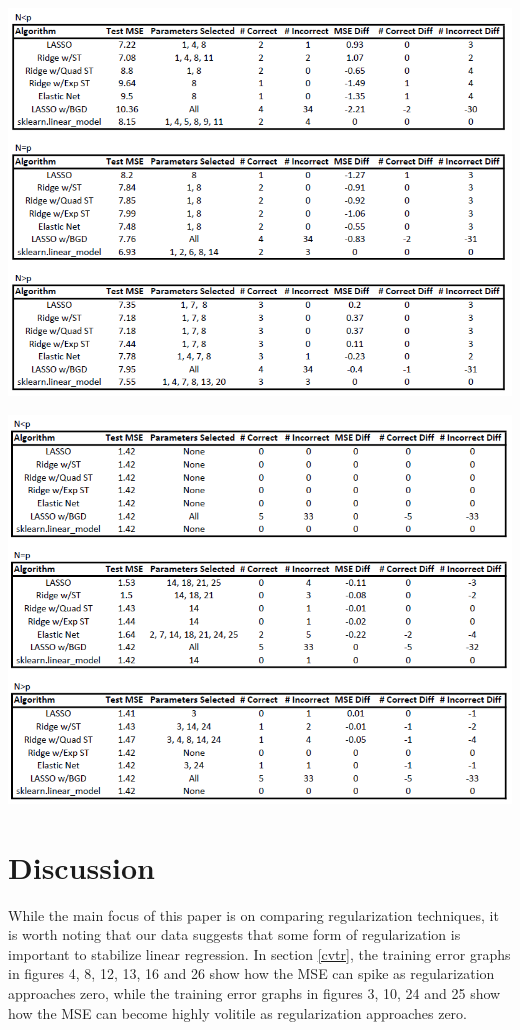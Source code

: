 \documentclass[11pt]{article}
\begin{document}
\begin{center}
\includegraphics[scale=0.7]{ortho.PNG}
\end{center}

\begin{center}
\includegraphics[scale=0.7]{corr.PNG}
\end{center}


\section{Discussion}
While the main focus of this paper is on comparing regularization techniques, it is worth noting that our data suggests that some form of regularization is important to stabilize linear regression.  In section \ref{cvtr}, the training error graphs in figures 4, 8, 12, 13, 16 and 26 show how the MSE can spike as regularization approaches zero, while the training error graphs in figures 3, 10, 24 and 25 show how the MSE can become highly volitile as regularization approaches zero.  \\
\end{document}
